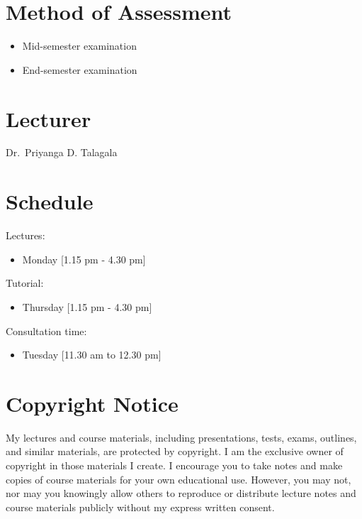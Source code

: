 \documentclass[]{book}
\providecommand{\tightlist}{%
  \setlength{\itemsep}{0pt}\setlength{\parskip}{0pt}}
\begin{document}
\hypertarget{method-of-assessment}{%
\section*{Method of Assessment}\label{method-of-assessment}}

\begin{itemize}
\tightlist
\item
  Mid-semester examination
\item
  End-semester examination
\end{itemize}

\hypertarget{lecturer}{%
\section*{Lecturer}\label{lecturer}}

Dr.~Priyanga D. Talagala

\hypertarget{schedule}{%
\section*{Schedule}\label{schedule}}

Lectures:

\begin{itemize}
\tightlist
\item
  Monday {[}1.15 pm - 4.30 pm{]}
\end{itemize}

Tutorial:

\begin{itemize}
\tightlist
\item
  Thursday {[}1.15 pm - 4.30 pm{]}
\end{itemize}

Consultation time:

\begin{itemize}
\tightlist
\item
  Tuesday {[}11.30 am to 12.30 pm{]}
\end{itemize}

\hypertarget{copyright-notice}{%
\section*{Copyright Notice}\label{copyright-notice}}

My lectures and course materials, including presentations, tests, exams, outlines, and similar materials, are protected by copyright. I am the exclusive owner of copyright in those materials I create. I encourage you to take notes and make copies of course materials for your own educational use. However, you may not, nor may you knowingly allow others to reproduce or distribute lecture notes and course materials publicly without my express written consent.
\end{document}
